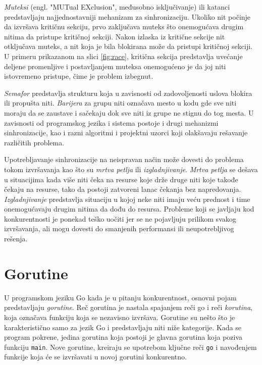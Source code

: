 \documentclass[12pt,oneside]{memoir}
\begin{document}
\textit{Muteksi} (engl. "MUTual EXclusion", međusobno isključivanje) ili katanci predstavljaju najjednostavniji mehanizam za sinhronizaciju. Ukoliko nit počinje da izvršava kritičnu sekciju, prvo zaključava muteks što onemogućava drugim nitima da pristupe kritičnoj sekciji. Nakon izlaska iz kritične sekcije nit otključava muteks, a nit koja je bila blokirana može da pristupi kritičnoj sekciji. U primeru prikazanom na slici \ref{fig:race}, kritična sekcija predstavlja uvećanje deljene promenljive i postavljanjem muteksa onemogućeno je da joj niti istovremeno pristupe, čime je problem izbegnut. 

\textit{Semafor} predstavlja strukturu koja u zavisnosti od zadovoljenosti uslova blokira ili propušta niti. \textit{Barijera} za grupu niti označava mesto u kodu gde sve niti moraju da se zaustave i sačekaju dok sve niti iz grupe ne stignu do tog mesta. U zavisnosti od programskog jezika i sistema postoje i drugi mehanizmi sinhronizacije, kao i razni algoritmi i projektni uzorci koji olakšavaju rešavanje različitih problema.

Upotrebljavanje sinhronizacije na neispravan način može dovesti do problema  tokom izvršavanja kao što su \textit{mrtva petlja} ili \textit{izgladnjivanje}. \textit{Mrtva petlja} se dešava u situacijima kada više niti čeka na resurse koje drže druge niti koje takođe čekaju na resurse, tako da postoji zatvoreni lanac čekanja bez napredovanja. \textit{Izgladnjivanje} predstavlja situaciju u kojoj neke niti imaju veću prednost i time onemogućavaju drugim nitima da dođu do resursa. Probleme koji se javljaju kod konkurentnosti je ponekad teško uočiti jer se ne pojavljuju prilikom svakog izvršavanja, ali mogu dovesti do smanjenih performansi ili neupotrebljivog rešenja. 

\section{Gorutine} \label{gorut}

U programskom jeziku Go kada je u pitanju konkurentnost, osnovni pojam predstavljaju \textit{gorutine}. Reč gorutina je nastala spajanjem reči go i reči \textit{korutina}, koja označava funkciju koja se nezavisno izvršava. Gorutine su nešto što je karakteristično samo za jezik Go i predstavljaju niti niže kategorije. Kada se program pokrene, jedina gorutina koja postoji je glavna gorutina koja poziva funkciju \texttt{main}. Nove gorutine, kreiraju se upotrebom ključne reči \texttt{go} i navođenjem funkcije koja će se izvršavati u novoj gorutini konkurentno. 
\end{document}
